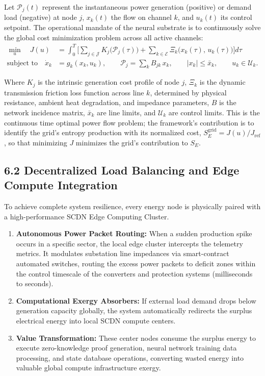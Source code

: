 \documentclass[11pt,a4paper]{article}
\theoremstyle{definition}
\theoremstyle{plain}
\theoremstyle{remark}
\begin{document}
Let $\mathcal P_j(t)$ represent the instantaneous power generation (positive) or demand load (negative) at node $j$, $x_k(t)$ the flow on channel $k$, and $u_k(t)$ its control setpoint. The operational mandate of the neural substrate is to continuously solve the global cost minimization problem across all active channels:
\begin{align}
\min_{u}\quad J(u) &= \int_0^T \Big[ \sum_{j \in \mathcal J} K_j\big( \mathcal P_j(\tau) \big)
+ \sum_{k \in \mathcal E} \Xi_k\big( x_k(\tau),\, u_k(\tau) \big) \Big] d\tau \\
\text{subject to}\quad \dot x_k &= g_k(x_k, u_k), \qquad \mathcal P_j = \sum_{k} B_{jk}\, x_k, \qquad |x_k| \le \bar x_k, \qquad u_k \in \mathcal U_k .
\end{align}

Where $K_j$ is the intrinsic generation cost profile of node $j$, $\Xi_k$ is the dynamic transmission friction loss function across line $k$, determined by physical resistance, ambient heat degradation, and impedance parameters, $B$ is the network incidence matrix, $\bar x_k$ are line limits, and $\mathcal U_k$ are control limits. This is the continuous time optimal power flow problem; the framework's contribution is to identify the grid's entropy production with its normalized cost, $S_E^{\mathrm{grid}} = J(u)/J_{\mathrm{ref}}$, so that minimizing $J$ minimizes the grid's contribution to $S_E$.

\subsection*{6.2 Decentralized Load Balancing and Edge Compute Integration}
To achieve complete system resilience, every energy node is physically paired with a high-performance SCDN Edge Computing Cluster.
\begin{enumerate}
\item \textbf{Autonomous Power Packet Routing:} When a sudden production spike occurs in a specific sector, the local edge cluster intercepts the telemetry metrics. It modulates substation line impedances via smart-contract automated switches, routing the excess power packets to deficit zones within the control timescale of the converters and protection systems (milliseconds to seconds).
\item \textbf{Computational Exergy Absorbers:} If external load demand drops below generation capacity globally, the system automatically redirects the surplus electrical energy into local SCDN compute centers.
\item \textbf{Value Transformation:} These center nodes consume the surplus energy to execute zero-knowledge proof generation, neural network training data processing, and state database operations, converting wasted energy into valuable global compute infrastructure exergy.
\end{enumerate}
\end{document}
